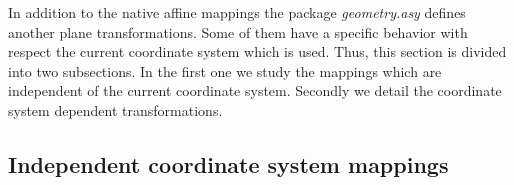 \documentclass[pdftex]{article}
\newcommand{\geo}{the package \emph{geometry.asy}\xspace}
\begin{document}
In addition to the native affine mappings \geo defines another plane
transformations. Some of them have a specific behavior with respect
the current coordinate system which is used. Thus, this section is
divided into two subsections. In the first one we study the mappings
which are independent of the current coordinate system. Secondly we
detail the coordinate system dependent transformations.
\subsection{Independent coordinate system mappings}
\end{document}
